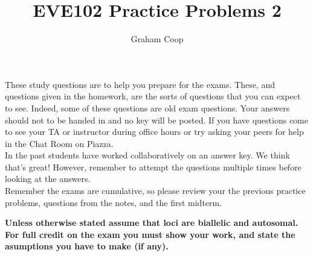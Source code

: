 \documentclass[12pt]{article}
\newcounter{question}[section]   %
\begin{document}
\title{EVE102 Practice Problems 2}
\author{Graham Coop}
\date{}
\maketitle

These study questions are to help you prepare for the exams.
These, and questions given in the homework, are the sorts of questions
that you can expect to see. Indeed, some of these questions are old
exam questions.  Your answers should not to be handed in and no key
will be posted.  If you have questions come to see your TA or
instructor during office hours or try asking your peers for help in
the Chat Room on Piazza.\\
 In the past students have worked
collaboratively on an answer key. We think that's great! However, remember to
attempt the questions multiple times before looking at the answers.\\

Remember the exams are cumulative, so please review your the previous
practice problems, questions from the notes, and the first midterm.


{\bf Unless otherwise stated assume that loci are biallelic and
autosomal. \\
For full credit on the exam you must show your work, and state the asumptions you have to make
(if any). }\\
\end{document}
